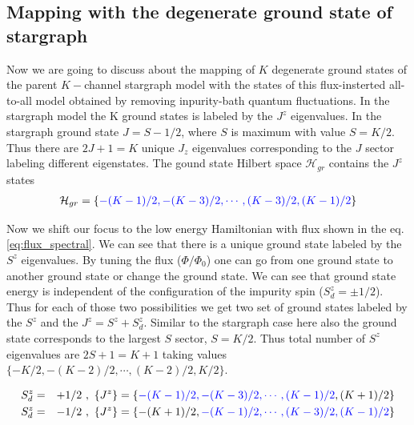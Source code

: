 \documentclass[reprint,prb,superscriptaddress]{revtex4-2}
\begin{document}
\subsection{Mapping with the degenerate ground state of stargraph}

\noindent Now we are going to discuss about the mapping of $K$ degenerate ground states of the parent $K-$channel stargraph model with the states of this flux-insterted all-to-all model obtained by removing inpurity-bath quantum fluctuations. In the stargraph model the K ground states is labeled by the $J^z$ eigenvalues. In the stargraph ground state $J=S-1/2$, where $S$ is maximum with value $S=K/2$. Thus there are $2J+1=K$ unique $J_z$ eigenvalues corresponding to the $J$ sector labeling different eigenstates. The gound state Hilbert space $\mathcal{H}_{gr}$ contains the $J^z$ states
\begin{eqnarray}
\mathcal{H}_{gr}=\{\textcolor{blue}{-(K-1)/2,-(K-3)/2,\cdots , (K-3)/2,(K-1)/2}\} \nonumber\\
\label{eq:stargraph_states}
\end{eqnarray}

\par Now we shift our focus to the low energy Hamiltonian with flux shown in the eq.\eqref{eq:flux_spectral}. We can see that there is a unique ground state labeled by the $S^z$ eigenvalues. By tuning the flux ($\Phi/\Phi_0$) one can go from one ground state to another ground state or change the ground state. We can see that ground state energy is independent of the configuration of the impurity spin ($S_d^z=\pm 1/2$). Thus for each of those two possibilities we get two set of ground states labeled by the $S^z$ and the $J^z=S^z+S^z_d$. Similar to the stargraph case here also the ground state corresponds to the largest $S$ sector, $S=K/2$. Thus total number of $S^z$ eigenvalues are $2S+1=K+1$ taking values $\{ -K/2, -(K-2)/2, \cdots, (K-2)/2, K/2 \}$.

\begin{widetext}
\begin{eqnarray}
S_d^z &=& +1/2~,~ \{J^z\}=\{ \textcolor{blue}{-(K-1)/2, -(K-3)/2, \cdots, (K-1)/2}, (K+1)/2\} \nonumber\\
S_d^z &=& -1/2~,~ \{J^z\}=\{-(K+1)/2,\textcolor{blue}{ -(K-1)/2, \cdots, (K-3)/2, (K-1)/2 } \}
\label{eq:all_to_all_states}
\end{eqnarray}
\end{widetext}
\end{document}
